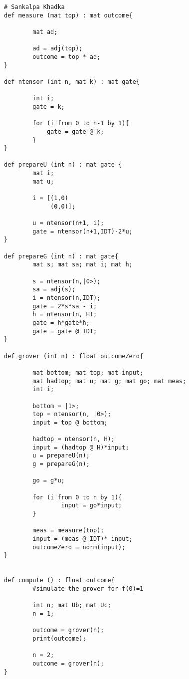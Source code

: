 \begin{lstlisting}
# Sankalpa Khadka
def measure (mat top) : mat outcome{
        
        mat ad;

        ad = adj(top);
        outcome = top * ad;
}

def ntensor (int n, mat k) : mat gate{
        
        int i;
        gate = k;

        for (i from 0 to n-1 by 1){
            gate = gate @ k; 
        }
}

def prepareU (int n) : mat gate {
        mat i;
        mat u;

        i = [(1,0)
             (0,0)];

        u = ntensor(n+1, i);
        gate = ntensor(n+1,IDT)-2*u;
}

def prepareG (int n) : mat gate{
        mat s; mat sa; mat i; mat h;

        s = ntensor(n,|0>);
        sa = adj(s);
        i = ntensor(n,IDT);
        gate = 2*s*sa - i;
        h = ntensor(n, H);
        gate = h*gate*h;
        gate = gate @ IDT;         
}

def grover (int n) : float outcomeZero{

        mat bottom; mat top; mat input;
        mat hadtop; mat u; mat g; mat go; mat meas;
        int i;

        bottom = |1>;
        top = ntensor(n, |0>);
        input = top @ bottom;
        
        hadtop = ntensor(n, H);
        input = (hadtop @ H)*input;
        u = prepareU(n);
        g = prepareG(n);
        
        go = g*u;
        
        for (i from 0 to n by 1){
                input = go*input; 
        }

        meas = measure(top);
        input = (meas @ IDT)* input;
        outcomeZero = norm(input);
}


def compute () : float outcome{
        #simulate the grover for f(0)=1
        
        int n; mat Ub; mat Uc;
        n = 1;
        
        outcome = grover(n);
        print(outcome);
        
        n = 2;
        outcome = grover(n);
}

\end{lstlisting}

